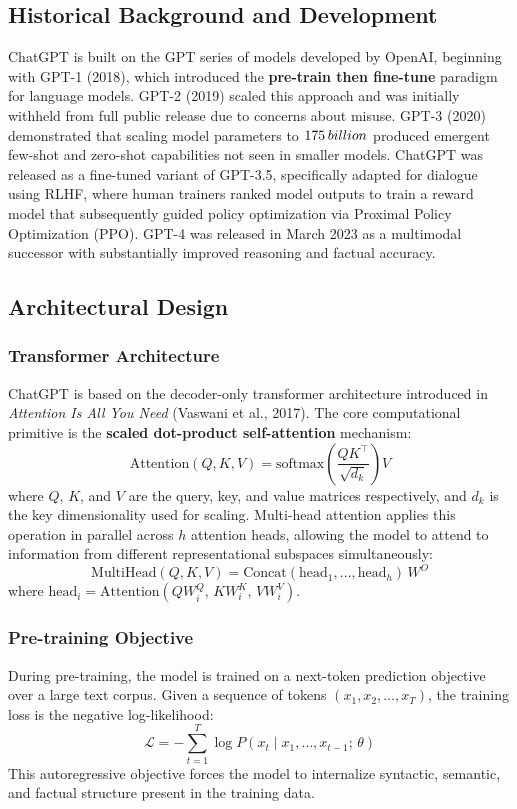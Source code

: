 \documentclass[11pt,a4paper]{report}
\begin{document}
\subsection{Historical Background and Development}
ChatGPT is built on the GPT series of models developed by OpenAI, beginning with GPT-1 (2018), which introduced
the \textbf{pre-train then fine-tune} paradigm for language models. GPT-2 (2019) scaled this approach and was
initially withheld from full public release due to concerns about misuse. GPT-3 (2020) demonstrated that scaling
model parameters to $175 \hspace{0.2em} billion$ produced emergent few-shot and zero-shot capabilities not seen
in smaller models. ChatGPT was released as a fine-tuned variant of GPT-3.5, specifically adapted for dialogue
using RLHF, where human trainers ranked model outputs to train a reward model that subsequently guided policy
optimization via Proximal Policy Optimization (PPO). GPT-4 was released in March 2023 as a multimodal successor
with substantially improved reasoning and factual accuracy.

\subsection{Architectural Design}

\subsubsection{Transformer Architecture}
ChatGPT is based on the decoder-only transformer architecture introduced in \textit{Attention Is All You Need}
(Vaswani et al., 2017). The core computational primitive is the \textbf{scaled dot-product self-attention} mechanism:
\[
\text{Attention}(Q, K, V) = \text{softmax}\!\left(\frac{QK^\top}{\sqrt{d_k}}\right) V
\]
where $Q$, $K$, and $V$ are the query, key, and value matrices respectively, and $d_k$ is the key dimensionality
used for scaling. Multi-head attention applies this operation in parallel across $h$ attention heads, allowing the
model to attend to information from different representational subspaces simultaneously:
\[
\text{MultiHead}(Q, K, V) = \text{Concat}(\text{head}_1, \ldots, \text{head}_h)\, W^O
\]
where $\text{head}_i = \text{Attention}(QW_i^Q,\, KW_i^K,\, VW_i^V)$.

\subsubsection{Pre-training Objective}
During pre-training, the model is trained on a next-token prediction objective over a large text corpus. Given a
sequence of tokens $(x_1, x_2, \ldots, x_T)$, the training loss is the negative log-likelihood:
\[
\mathcal{L} = -\sum_{t=1}^{T} \log P(x_t \mid x_1, \ldots, x_{t-1};\, \theta)
\]
This autoregressive objective forces the model to internalize syntactic, semantic, and factual structure present
in the training data.
\end{document}
